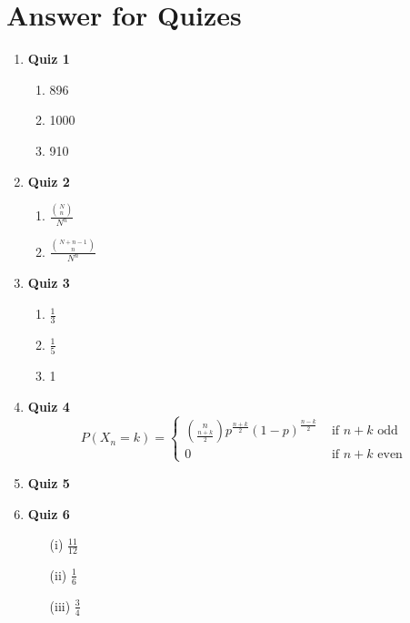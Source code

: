 \documentclass{article}
\begin{document}
\newpage
\appendix


\section{Answer for Quizes}
\begin{enumerate}



\item \textbf{\large Quiz 1}
    \begin{enumerate}
        \item 896
        \item 1000
        \item 910
    \end{enumerate}

\item \textbf{\large Quiz 2}
    \begin{enumerate}
        \item $\frac{\binom{N}{n}}{N^n}$
        \item $\frac{\binom{N+n-1}{n}}{N^n}$
    \end{enumerate}

\item \textbf{\large Quiz 3}
    \begin{enumerate}
        \item $\frac{1}{3}$
        \item $\frac{1}{5}$
        \item 1
    \end{enumerate}

\item \textbf{\large Quiz 4}
    \[
    P(X_n = k) =
    \begin{cases}
        \binom{n}{\frac{n+k}{2}}p^{\frac{n+k}{2}}(1-p)^{\frac{n-k}{2}} & \text{ if } n+k \text{ odd } \\
        0 & \text{ if } n+k \text{ even }
    \end{cases}
    \]


\item \textbf{\large Quiz 5}


\item \textbf{\large Quiz 6}
\begin{enumerate}
    \item[(i)] $\frac{11}{12}$
    \item[(ii)] $\frac{1}{6}$
    \item[(iii)] $\frac{3}{4}$
\end{enumerate}


\end{enumerate}
\end{document}

